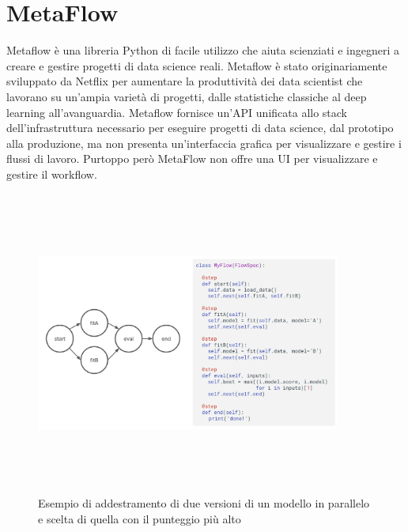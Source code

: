 \documentclass[12pt,a4paper]{report}
\begin{document}
\section{MetaFlow}
Metaflow è una libreria Python di facile utilizzo che aiuta scienziati e ingegneri a creare e gestire progetti di data science reali. Metaflow è stato originariamente sviluppato da Netflix per aumentare la produttività dei data scientist che lavorano su un'ampia varietà di progetti, dalle statistiche classiche al deep learning all'avanguardia.
Metaflow fornisce un'API unificata allo stack dell'infrastruttura necessario per eseguire progetti di data science, dal prototipo alla produzione, ma non presenta un'interfaccia grafica per visualizzare e gestire i flussi di lavoro.
Purtoppo però MetaFlow non offre una UI per visualizzare e gestire il workflow.\\

\begin{figure}[h!]
    \begin{center}
        \includegraphics[width=10cm,height=10cm,keepaspectratio]{MetaFlow}
    \end{center}
    \caption{Esempio di addestramento di due versioni di un modello in parallelo e scelta di quella con il punteggio più alto}
    \label{fig:ex-MetaFlow}
\end{figure}
\end{document}
